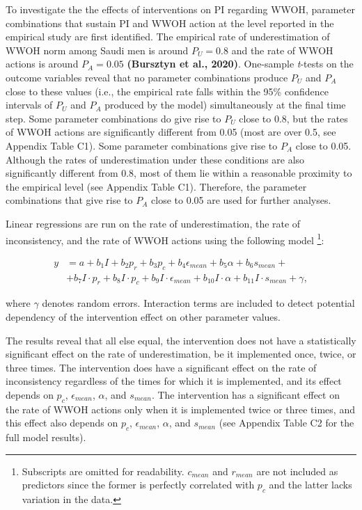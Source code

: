 \documentclass[
  11pt,
]{article}
\begin{document}
To investigate the the effects of interventions on PI regarding WWOH,
parameter combinations that sustain PI and WWOH action at the level
reported in the empirical study are first identified. The empirical rate
of underestimation of WWOH norm among Saudi men is around \(P_U = 0.8\)
and the rate of WWOH actions is around \(P_A = 0.05\) \textbf{(Bursztyn
et al., 2020)}. One-sample \emph{t}-tests on the outcome variables
reveal that no parameter combinations produce \(P_U\) and \(P_A\) close
to these values (i.e., the empirical rate falls within the 95\%
confidence intervals of \(P_U\) and \(P_A\) produced by the model)
simultaneously at the final time step. Some parameter combinations do
give rise to \(P_U\) close to 0.8, but the rates of WWOH actions are
significantly different from 0.05 (most are over 0.5, see Appendix Table
C1). Some parameter combinations give rise to \(P_A\) close to 0.05.
Although the rates of underestimation under these conditions are also
significantly different from 0.8, most of them lie within a reasonable
proximity to the empirical level (see Appendix Table C1). Therefore, the
parameter combinations that give rise to \(P_A\) close to 0.05 are used
for further analyses.

Linear regressions are run on the rate of underestimation, the rate of
inconsistency, and the rate of WWOH actions using the following model
\footnote{Subscripts are omitted for readability. $c_{mean}$ and $r_{mean}$ are not included as predictors since the former is perfectly correlated with $p_c$ and the latter lacks variation in the data.}:

\begin{equation}
  \begin{aligned}
  y &= a + b_1I + b_2p_r + b_3p_c + b_4\epsilon_{mean} + b_5\alpha + b_6s_{mean} +\\
  &+ b_7I \cdot p_r + b_{8}I \cdot p_c + b_{9}I \cdot \epsilon_{mean} + b_{10}I \cdot \alpha + b_{11}I \cdot s_{mean} + \gamma,
  \end{aligned}
\end{equation}

where \(\gamma\) denotes random errors. Interaction terms are included
to detect potential dependency of the intervention effect on other
parameter values.

The results reveal that all else equal, the intervention does not have a
statistically significant effect on the rate of underestimation, be it
implemented once, twice, or three times. The intervention does have a
significant effect on the rate of inconsistency regardless of the times
for which it is implemented, and its effect depends on \(p_c\),
\(\epsilon_{mean}\), \(\alpha\), and \(s_{mean}\). The intervention has
a significant effect on the rate of WWOH actions only when it is
implemented twice or three times, and this effect also depends on
\(p_c\), \(\epsilon_{mean}\), \(\alpha\), and \(s_{mean}\) (see Appendix
Table C2 for the full model results).
\end{document}
